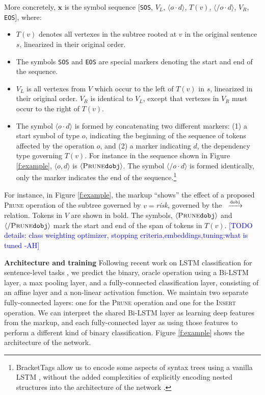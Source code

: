 \documentclass[11pt,a4paper]{article}
\newcommand{\rdep}[1]{\ $\xrightarrow{\text{\tiny #1}}$\ }
\newcommand{\ahcomment}[1]{\textcolor{blue}{[#1 -AH]}}
\begin{document}
More concretely, $\bm{x}$ is the symbol sequence [\texttt{SOS}, $V_L$, $\langle {o \cdot d} \rangle$, $T(v)$, $\langle{/o\cdot d}\rangle$, $V_R$, \texttt{EOS}], where:

\begin{itemize}
\item{$T(v)$ denotes all vertexes in the subtree rooted at $v$ in the original sentence $s$, linearized in their original order.}
\item{The symbols \texttt{SOS} and \texttt{EOS} are special markers denoting the start and end of the sequence.}
\item{$V_L$ is all vertexes from $V$ which occur to the left of $T(v)$ in $s$, linearized in their original order. $V_R$ is identical to $V_L$, except that vertexes in $V_R$ must occur to the right of $T(v)$.}
\item{The symbol $\langle o \cdot d \rangle$ is formed by concatenating two different markers: (1) a start symbol of type $o$, indicating the beginning of the sequence of tokens affected by the operation $o$, and (2) a marker indicating $d$, the dependency type governing $T(v)$. For instance in the sequence shown in Figure \ref{f:example}, $\langle o, d \rangle$ is $\langle \textsc{Prune} \texttt{dobj} \rangle$. The symbol $\langle / o \cdot d \rangle$ is formed identically, only the marker indicates the end of the sequence.\footnote{BracketTags allow us to encode some aspects of syntax trees using a vanilla LSTM \cite{Vinyals2015GrammarAA,Aharoni2017TowardsSN}, without the added complexities of explicitly encoding nested structures into the architecture of the network \cite{Tai2015ImprovedSR,Dyer2016RecurrentNN}.}}
\end{itemize}

For instance, in Figure \ref{f:example}, the markup ``shows'' the  effect of a proposed \textsc{Prune} operation of the subtree governed by $v=$\textit{risk}, governed by the \rdep{dobj} relation. Tokens in $V$ are shown in bold. The symbols, $\langle \textsc{Prune} \texttt{dobj} \rangle$  and $\langle / \textsc{Prune} \texttt{dobj} \rangle$ mark the start and end of the span of tokens in $T(v)$.
\ahcomment{TODO details: class weighting optimizer, stopping criteria,embeddings,tuning:what is tuned}

\textbf{Architecture and training} Following recent work on LSTM classification for sentence-level tasks \cite{D17-1070}, we predict the binary, oracle operation using a Bi-LSTM layer, a max pooling layer, and a fully-connected classification layer, consisting of an affine layer and a non-linear activation function. We maintain two separate fully-connected layers: one for the \textsc{Prune} operation and one for the \textsc{Insert} operation. We can interpret the shared Bi-LSTM layer as learning deep features from the markup, and each fully-connected layer as using those features to perform a different kind of binary classification. Figure \ref{f:example} shows the architecture of the network. 
\end{document}
